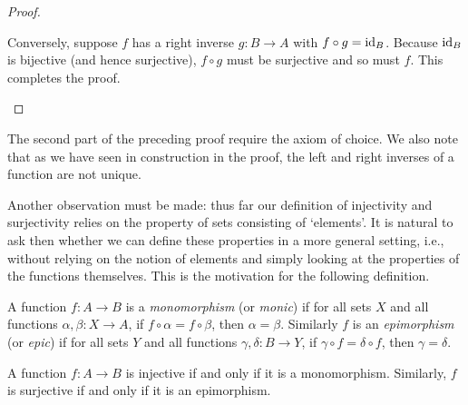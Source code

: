 \begin{proof}
\begin{enumerate}[label=(\alph*), wide]
        Conversely, suppose \(f\) has a right inverse \(g : B \to A\) with \(f
        \circ g = \operatorname{id}_B\). Because \(\operatorname{id}_B\) is bijective (and hence
        surjective), \(f \circ g\) must be surjective and so must \(f\). This
        completes the proof.
    \end{enumerate}
\end{proof}

\begin{remark}
    The second part of the preceding proof require the axiom of choice. We also
    note that as we have seen in construction in the proof, the left and right
    inverses of a function are not unique.

    Another observation must be made: thus far our definition of injectivity and surjectivity relies on the property of sets consisting of `elements'. It is natural to ask then whether we can define these properties in a more general setting, i.e., without relying on the notion of elements and simply looking at the properties of the functions themselves. This is the motivation for the following definition.
\end{remark}

\begin{definition}
    A function \(f: A \to B\) is a \emph{monomorphism} (or \emph{monic}) if for
    all sets \(X\) and all functions \(\alpha, \beta: X \to A\), if \(f \circ
    \alpha = f \circ \beta\), then \(\alpha = \beta\). Similarly \(f\) is an
    \emph{epimorphism} (or \emph{epic}) if for all sets \(Y\) and all functions
    \(\gamma, \delta: B \to Y\), if \(\gamma \circ f = \delta \circ f\), then
    \(\gamma = \delta\).
\end{definition}

\begin{theorem}
    A function \(f: A \to B\) is injective if and only if it is a monomorphism.
    Similarly, \(f\) is surjective if and only if it is an epimorphism.
\end{theorem}

